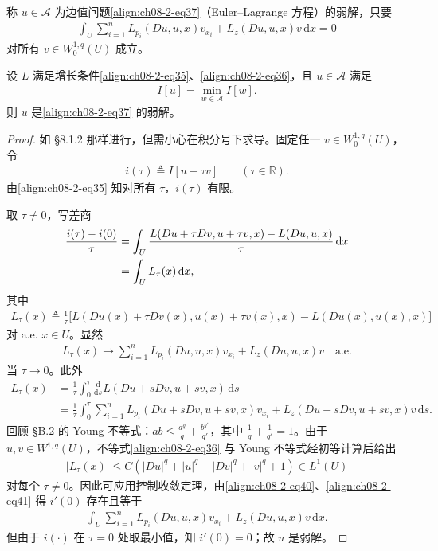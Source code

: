 \documentclass[../../main.tex]{subfiles}
\begin{document}
\begin{definition}\label{definition:ch08-2-EulerLagrange弱解}
称 $u\in\mathcal{A}$ 为边值问题\eqref{align:ch08-2-eq37}（Euler--Lagrange 方程）的弱解，只要
\begin{align*}
\int_U\sum_{i=1}^n L_{p_i}(Du,u,x)v_{x_i}+L_z(Du,u,x)v\,\mathrm{d}x=0
\end{align*}
对所有 $v\in W_0^{1,q}(U)$ 成立。
\end{definition}

\begin{theorem}\label{theorem:ch08-2-4-EulerLagrange弱解}
设 $L$ 满足增长条件\eqref{align:ch08-2-eq35}、\eqref{align:ch08-2-eq36}，且 $u\in\mathcal{A}$ 满足
\begin{align*}
I[u]=\min_{w\in\mathcal{A}}I[w].
\end{align*}
则 $u$ 是\eqref{align:ch08-2-eq37} 的弱解。
\begin{proof}
如 \S8.1.2 那样进行，但需小心在积分号下求导。固定任一 $v\in W_0^{1,q}(U)$，令
\begin{align*}
i(\tau)\triangleq I[u+\tau v]\qquad (\tau\in\mathbb{R}).
\end{align*}
由\eqref{align:ch08-2-eq35} 知对所有 $\tau$，$i(\tau)$ 有限。

取 $\tau\neq 0$，写差商
\begin{align}
\frac{i(\tau)-i(0)}{\tau}&=\int_U\frac{L(Du+\tau Dv,u+\tau v,x)-L(Du,u,x)}{\tau}\,\mathrm{d}x\notag\\
&=\int_U L_\tau(x)\,\mathrm{d}x,\label{align:ch08-2-eq40}
\end{align}
其中
\begin{align*}
L_\tau(x)\triangleq\frac1\tau\big[L(Du(x)+\tau Dv(x),u(x)+\tau v(x),x)-L(Du(x),u(x),x)\big]
\end{align*}
对 a.e. $x\in U$。显然
\begin{align}
L_\tau(x)\to\sum_{i=1}^n L_{p_i}(Du,u,x)v_{x_i}+L_z(Du,u,x)v\quad\text{a.e.}\label{align:ch08-2-eq41}
\end{align}
当 $\tau\to 0$。此外
\begin{align*}
L_\tau(x)&=\frac1\tau\int_0^\tau\frac{\mathrm{d}}{\mathrm{d}s}L(Du+sDv,u+sv,x)\,\mathrm{d}s\\
&=\frac1\tau\int_0^\tau\sum_{i=1}^n L_{p_i}(Du+sDv,u+sv,x)v_{x_i}+L_z(Du+sDv,u+sv,x)v\,\mathrm{d}s.
\end{align*}
回顾 \S B.2 的 Young 不等式：$ab\leqslant\frac{a^q}{q}+\frac{b^{q'}}{q'}$，其中 $\frac1q+\frac1{q'}=1$。由于 $u,v\in W^{1,q}(U)$，不等式\eqref{align:ch08-2-eq36} 与 Young 不等式经初等计算后给出
\begin{align*}
|L_\tau(x)|\leqslant C(|Du|^q+|u|^q+|Dv|^q+|v|^q+1)\in L^1(U)
\end{align*}
对每个 $\tau\neq 0$。因此可应用控制收敛定理，由\eqref{align:ch08-2-eq40}、\eqref{align:ch08-2-eq41} 得 $i'(0)$ 存在且等于
\begin{align*}
\int_U\sum_{i=1}^n L_{p_i}(Du,u,x)v_{x_i}+L_z(Du,u,x)v\,\mathrm{d}x.
\end{align*}
但由于 $i(\cdot)$ 在 $\tau=0$ 处取最小值，知 $i'(0)=0$；故 $u$ 是弱解。
\end{proof}
\end{theorem}
\end{document}
